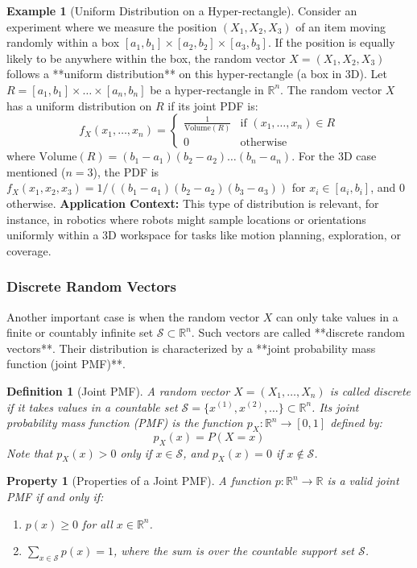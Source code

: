 \documentclass[11pt, a4paper]{article}
\newtheorem{definition}[theorem]{Definition}
\newtheorem{property}[theorem]{Property}
\theoremstyle{definition} %
\newtheorem{example}[theorem]{Example}
\newcommand{\R}{\mathbb{R}}
\begin{document}
\begin{example}[Uniform Distribution on a Hyper-rectangle] \label{ex:uniform_box}
Consider an experiment where we measure the position $(X_1, X_2, X_3)$ of an item moving randomly within a box $[a_1, b_1] \times [a_2, b_2] \times [a_3, b_3]$. If the position is equally likely to be anywhere within the box, the random vector $X = (X_1, X_2, X_3)$ follows a **uniform distribution** on this hyper-rectangle (a box in 3D).
Let $R = [a_1, b_1] \times \dots \times [a_n, b_n]$ be a hyper-rectangle in $\R^n$. The random vector $X$ has a uniform distribution on $R$ if its joint PDF is:
\[ f_X(x_1, \dots, x_n) = \begin{cases}
    \frac{1}{\text{Volume}(R)} & \text{if } (x_1, \dots, x_n) \in R \\
    0 & \text{otherwise}
\end{cases} \]
where $\text{Volume}(R) = (b_1 - a_1)(b_2 - a_2)\dots(b_n - a_n)$.
For the 3D case mentioned ($n=3$), the PDF is $f_X(x_1, x_2, x_3) = 1/((b_1-a_1)(b_2-a_2)(b_3-a_3))$ for $x_i \in [a_i, b_i]$, and 0 otherwise.
\textbf{Application Context:} This type of distribution is relevant, for instance, in robotics where robots might sample locations or orientations uniformly within a 3D workspace for tasks like motion planning, exploration, or coverage.
\end{example}

\subsubsection*{Discrete Random Vectors}

Another important case is when the random vector $X$ can only take values in a finite or countably infinite set $\mathcal{S} \subset \R^n$. Such vectors are called **discrete random vectors**. Their distribution is characterized by a **joint probability mass function (joint PMF)**.

\begin{definition}[Joint PMF]
A random vector $X = (X_1, \dots, X_n)$ is called discrete if it takes values in a countable set $\mathcal{S} = \{x^{(1)}, x^{(2)}, \dots\} \subset \R^n$. Its joint probability mass function (PMF) is the function $p_X: \R^n \to [0, 1]$ defined by:
\[ p_X(x) = P(X = x) \]
Note that $p_X(x) > 0$ only if $x \in \mathcal{S}$, and $p_X(x) = 0$ if $x \notin \mathcal{S}$.
\end{definition}

\begin{property}[Properties of a Joint PMF]
A function $p: \R^n \to \R$ is a valid joint PMF if and only if:
\begin{enumerate}
    \item $p(x) \ge 0$ for all $x \in \R^n$.
    \item $\sum_{x \in \mathcal{S}} p(x) = 1$, where the sum is over the countable support set $\mathcal{S}$.
\end{enumerate}
\end{property}
\end{document}
